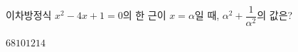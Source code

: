 이차방정식 $x^2-4x+1=0$의 한 근이 $x=\alpha$일 때, $\alpha^2+\dfrac{1}{\alpha^2}$의 값은?
\begin{choices32}{$6$}{$8$}{$10$}{$12$}{$14$}\end{choices32}
